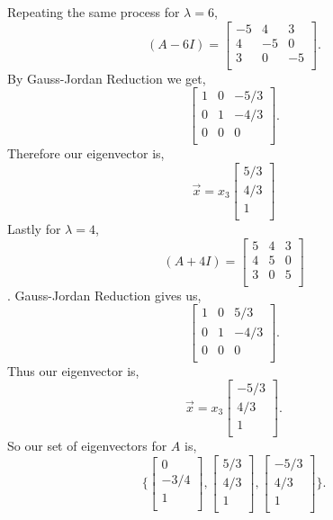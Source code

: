 Repeating the same process for $\lambda = 6$,
\[(A-6I) = \begin{bmatrix} -5 & 4 & 3 \\ 4 & -5 & 0 \\ 3 & 0 & -5 \\ \end{bmatrix}.\]
By Gauss-Jordan Reduction we get, 
\[\begin{bmatrix} 1 & 0 & -5/3 \\ 0 & 1 & -4/3 \\ 0 & 0 & 0 \\ \end{bmatrix}.\]
Therefore our eigenvector is, 
\[\vec{x} = x_3\begin{bmatrix} 5/3 \\ 4/3 \\ 1 \\ \end{bmatrix} \]
Lastly for $\lambda = 4$,
\[(A + 4I) = \begin{bmatrix} 5 & 4 & 3 \\ 4 & 5 & 0 \\
3 & 0 & 5 \\ \end{bmatrix} \].
Gauss-Jordan Reduction gives us, 
\[\begin{bmatrix} 1 & 0 & 5/3 \\ 0 & 1 & -4/3 \\ 0 & 0 & 0 \\ \end{bmatrix}. \]
Thus our eigenvector is, 
\[\vec{x} = x_3 \begin{bmatrix} -5/3 \\ 4/3 \\ 1 \\ \end{bmatrix}.\]
So our set of eigenvectors for $A$ is, 
\[\biggl\{\begin{bmatrix} 0 \\ -3/4 \\ 1 \\ \end{bmatrix}, \begin{bmatrix} 5/3 \\ 4/3 \\ 1 \\ \end{bmatrix}, \begin{bmatrix} -5/3 \\ 4/3 \\ 1 \\ \end{bmatrix}\biggr \}. \]

